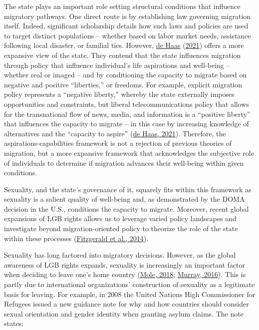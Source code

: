 \documentclass[
  11pt,
]{article}
\begin{document}
The state plays an important role setting structural conditions that influence migratory pathways. One direct route is by establishing law governing migration itself. Indeed, significant scholarship details how such laws and policies are used to target distinct populations -- whether based on labor market needs, assistance following local disaster, or familial ties. However, \protect\hyperlink{ref-dehaas_2021}{de Haas} (\protect\hyperlink{ref-dehaas_2021}{2021}) offers a more expansive view of the state. They contend that the state influences migration through policy that influence individual's life aspirations and well-being -- whether real or imaged -- and by conditioning the capacity to migrate based on negative and positive ``liberties,'' or freedoms. For example, explicit migration policy represents a ``negative liberty,'' whereby the state externally imposes opportunities and constraints, but liberal telecommunications policy that allows for the transnational flow of news, media, and information is a ``positive liberty'' that influences the capacity to migrate -- in this case by increasing knowledge of alternatives and the ``capacity to aspire'' (\protect\hyperlink{ref-dehaas_2021}{de Haas, 2021}). Therefore, the aspirations-capabilities framework is not a rejection of previous theories of migration, but a more expansive framework that acknowledges the subjective role of individuals to determine if migration advances their well-being within given conditions.

Sexuality, and the state's governance of it, squarely fits within this framework as sexuality is a salient quality of well-being and, as demonstrated by the DOMA decision in the U.S., conditions the capacity to migrate. Moreover, recent global expansions of LGB rights allows us to leverage varied policy landscapes and investigate beyond migration-oriented policy to theorize the role of the state within these processes (\protect\hyperlink{ref-fitzgerald_2014}{Fitzgerald et al., 2014}).

Sexuality has long factored into migratory decisions. However, as the global awareness of LGB rights expands, sexuality is increasingly an important factor when deciding to leave one's home country (\protect\hyperlink{ref-mole_2018a}{Mole, 2018}; \protect\hyperlink{ref-murray_2016}{Murray, 2016}). This is partly due to international organizations' construction of sexuality as a legitimate basis for leaving. For example, in 2008 the United Nations High Commissioner for Refugees issued a new guidance note for why and how countries should consider sexual orientation and gender identity when granting asylum claims. The note states:
\end{document}
